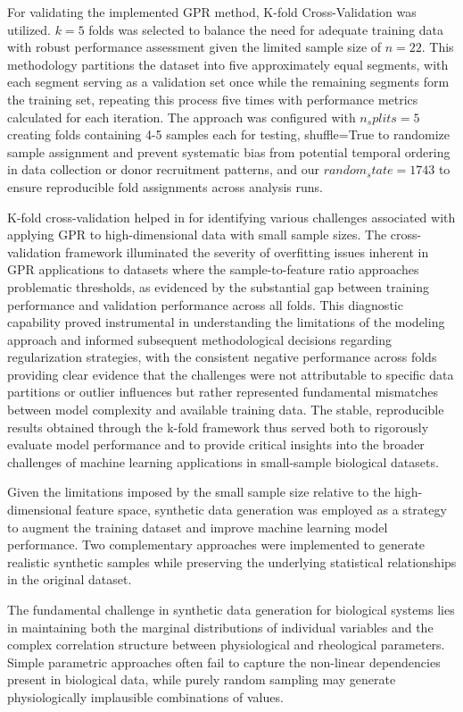 \documentclass[12pt,letterpaper]{article}
\begin{document}
For validating the implemented GPR method, K-fold Cross-Validation was utilized. $k=5$ folds was selected to balance the need for adequate training data with robust
performance assessment given the limited sample size of $n=22$. This methodology partitions the dataset into five approximately equal segments, with each segment serving
as a validation set once while the remaining segments form the training set, repeating this process five times with performance metrics calculated for each iteration.
The approach was configured with $n_splits=5$ creating folds containing 4-5 samples each for testing, shuffle=True to randomize sample assignment and prevent systematic
bias from potential temporal ordering in data collection or donor recruitment patterns, and our $random_state=1743$ to ensure reproducible fold assignments across analysis runs.

K-fold cross-validation helped in for identifying various challenges associated with applying GPR to high-dimensional data with small sample sizes.
The cross-validation framework illuminated the severity of overfitting issues inherent in GPR applications to datasets where the sample-to-feature ratio approaches problematic thresholds,
as evidenced by the substantial gap between training performance and validation performance across all folds. This diagnostic capability proved instrumental in understanding the
limitations of the modeling approach and informed subsequent methodological decisions regarding regularization strategies, with the consistent negative performance across folds
providing clear evidence that the challenges were not attributable to specific data partitions or outlier influences but rather represented fundamental mismatches between model
complexity and available training data. The stable, reproducible results obtained through the k-fold framework thus served both to rigorously evaluate model performance and to provide
critical insights into the broader challenges of machine learning applications in small-sample biological datasets.

Given the limitations imposed by the small sample size relative to the high-dimensional feature space, synthetic data generation was employed as a strategy
to augment the training dataset and improve machine learning model performance. Two complementary approaches were implemented to generate realistic synthetic
samples while preserving the underlying statistical relationships in the original dataset.

The fundamental challenge in synthetic data generation for biological systems lies in maintaining both the marginal distributions of individual variables
and the complex correlation structure between physiological and rheological parameters. Simple parametric approaches often fail to capture the non-linear dependencies
present in biological data, while purely random sampling may generate physiologically implausible combinations of values.
\end{document}
